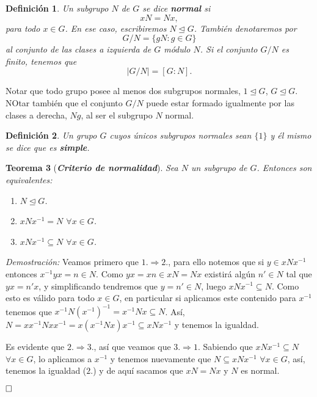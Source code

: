 \documentclass[12pt]{article}
\newtheorem{theorem}{Teorema}[section]
\newtheorem{definition}[theorem]{Definición}
\begin{document}
\begin{definition} Un subgrupo $N$ de $G$ se dice \textbf{normal} si $$xN = Nx,$$ para todo $x \in G$. En ese caso, escribiremos $N \unlhd G$. También denotaremos por $$G/N = \lbrace gN : g\in G\rbrace$$ al conjunto de las clases a izquierda de $G$ módulo $N$. Si el conjunto $G/N$ es finito, tenemos que $$|G/N| = [G:N].$$
\end{definition}

Notar que todo grupo posee al menos dos subgrupos normales, $1 \unlhd G$, $G \unlhd G$. NOtar también que el conjunto $G/N$ puede estar formado igualmente por las clases a derecha, $Ng$, al ser el subgrupo $N$ normal.

\begin{definition} Un grupo $G$ cuyos únicos subgrupos normales sean $\lbrace 1 \rbrace$ y él mismo se dice que es \textbf{simple}.
\end{definition}

\begin{theorem}[\textbf{\textit{Criterio de normalidad}}]
Sea $N$ un subgrupo de $G$. Entonces son equivalentes:
\begin{enumerate}
\item $N\unlhd G$.
\item $xN x^{-1} = N$ $\forall x \in G$.
\item $xNx^{-1} \subseteq N$ $\forall x \in G$.
\end{enumerate}
\end{theorem}
\emph{Demostración: }Veamos primero que $1.\Rightarrow 2.$, para ello notemos que si $y\in xNx^{-1}$ entonces $x^{-1}yx = n \in N$. Como $yx = xn \in xN = Nx$ existirá algún $n' \in N$ tal que $yx = n'x$, y simplificando tendremos que $y = n' \in N$, luego $xNx^{-1} \subseteq N$. Como esto es válido para todo $x \in G$, en particular si aplicamos este contenido para $x^{-1}$ tenemos que $x^{-1}N(x^{-1})^{-1}= x^{-1}Nx \subseteq N$. Así, $N = xx^{-1}Nxx^{-1} = x(x^{-1}Nx)x^{-1} \subseteq xNx^{-1}$ y tenemos la igualdad. 

Es evidente que $2.\Rightarrow 3.$, así que veamos que $3.\Rightarrow 1.$ Sabiendo que $xNx^{-1} \subseteq N$ $\forall x\in G$, lo aplicamos a $x^{-1}$ y tenemos nuevamente que $N \subseteq xNx^{-1}$ $\forall x \in G$, así, tenemos la igualdad ($2.$) y de aquí sacamos que $xN = Nx$ y $N$ es normal.

$\hfill \square$
\end{document}
